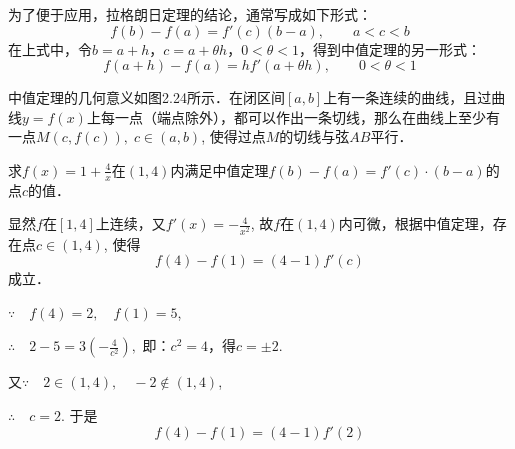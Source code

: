 为了便于应用，拉格朗日定理的结论，通常写成如下形式：
\begin{equation}
   f (b) -f (a) =f' (c) (b-a),\qquad a<c<b 
\end{equation}
在上式中，令$b=a+h$，$c=a+\theta h$，$0<\theta<1$，得到中值定理的另一形式：
\begin{equation}
    f (a+h) -f (a) =hf' (a+\theta h) ,\qquad 0<\theta<1
\end{equation}

中值定理的几何意义如图2.24所示．在闭区间$[a,b]$上有一条连续的曲线，且过曲线$y=f(x)$上每一点（端点除外），都可以作出一条切线，那么在曲线上至少有一点$M(c, f( c)),\; c\in (a,b)$, 使得过点$M$的切线与弦$AB$平行．

\begin{figure}[htp]
    \centering
{}
    \caption{}
\end{figure}



\begin{example}
求$f(x)=1+\frac{4}{x}$在$(1, 4)$内满足中值定理$f(b)-f(a)=f'(c)\cdot (b-a)$的点$c$的值．
\end{example}


\begin{solution}
    显然$f$在$[1, 4]$上连续，又$f'(x)=-\frac{4}{x^2}$, 故$f$在$(1, 4)$内可微，根据中值定理，存在点$c\in (1, 4)$, 使得
\[    f (4) -f (1) = (4-1) f' (c)\]
成立．

$\because\quad f (4) =2,\quad f (1) =5$,

$\therefore\quad 2-5=3 \left(-\frac{4}{c^2}\right),$
即：$c^2=4$，得$c=\pm 2$.

又$\because\quad 2\in (1, 4),\quad -2\notin (1, 4)$,

$\therefore\quad c=2$. 于是
\[    f (4) -f (1) = (4-1) f' (2) \]
\end{solution}

